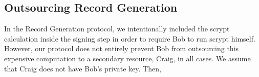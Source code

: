 \documentclass{sig-alternate}
\begin{document}

%

\newpage

\subsection{Outsourcing Record Generation}

In the Record Generation protocol, we intentionally included the scrypt calculation inside the signing step in order to require Bob to run scrypt himself. However, our protocol does not entirely prevent Bob from outsourcing this expensive computation to a secondary resource, Craig, in all cases. We assume that Craig does not have Bob's private key. Then,
\end{document}
